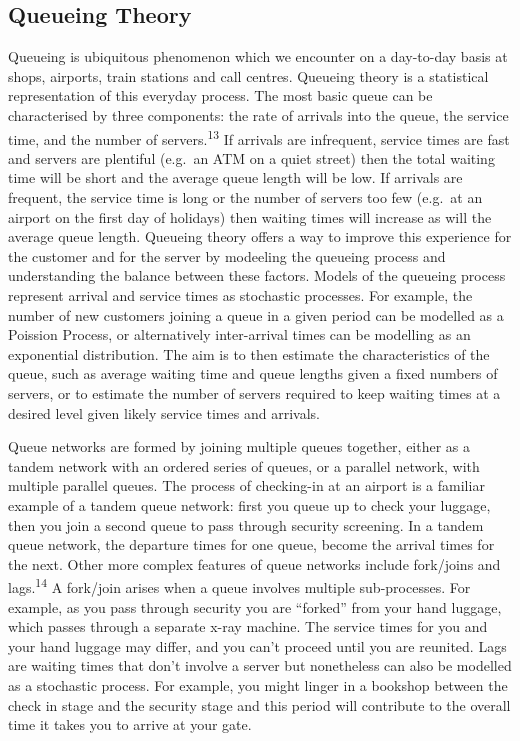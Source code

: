 \documentclass{article}
\begin{document}
\hypertarget{queueing-theory}{%
\subsection{Queueing Theory}\label{queueing-theory}}

Queueing is ubiquitous phenomenon which we encounter on a day-to-day
basis at shops, airports, train stations and call centres. Queueing
theory is a statistical representation of this everyday process. The
most basic queue can be characterised by three components: the rate of
arrivals into the queue, the service time, and the number of
servers.\textsuperscript{13} If arrivals are infrequent, service times
are fast and servers are plentiful (e.g.~an ATM on a quiet street) then
the total waiting time will be short and the average queue length will
be low. If arrivals are frequent, the service time is long or the number
of servers too few (e.g.~at an airport on the first day of holidays)
then waiting times will increase as will the average queue length.
Queueing theory offers a way to improve this experience for the customer
and for the server by modeeling the queueing process and understanding
the balance between these factors. Models of the queueing process
represent arrival and service times as stochastic processes. For
example, the number of new customers joining a queue in a given period
can be modelled as a Poission Process, or alternatively inter-arrival
times can be modelling as an exponential distribution. The aim is to
then estimate the characteristics of the queue, such as average waiting
time and queue lengths given a fixed numbers of servers, or to estimate
the number of servers required to keep waiting times at a desired level
given likely service times and arrivals.

Queue networks are formed by joining multiple queues together, either as
a tandem network with an ordered series of queues, or a parallel
network, with multiple parallel queues. The process of checking-in at an
airport is a familiar example of a tandem queue network: first you queue
up to check your luggage, then you join a second queue to pass through
security screening. In a tandem queue network, the departure times for
one queue, become the arrival times for the next. Other more complex
features of queue networks include fork/joins and
lags.\textsuperscript{14} A fork/join arises when a queue involves
multiple sub-processes. For example, as you pass through security you
are ``forked'' from your hand luggage, which passes through a separate
x-ray machine. The service times for you and your hand luggage may
differ, and you can't proceed until you are reunited. Lags are waiting
times that don't involve a server but nonetheless can also be modelled
as a stochastic process. For example, you might linger in a bookshop
between the check in stage and the security stage and this period will
contribute to the overall time it takes you to arrive at your gate.
\end{document}
